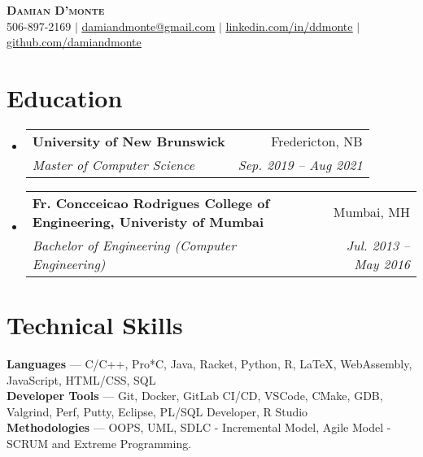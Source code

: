 \documentclass[letterpaper,10pt]{article}
\makeatletter
\newcommand{\resumeSubheading}[4]{
  \vspace{-2pt}\item
    \begin{tabular*}{0.97\textwidth}[t]{l@{\extracolsep{\fill}}r}
      \textbf{#1} & #2 \\
      \textit{\small#3} & \textit{\small #4} \\
    \end{tabular*}\vspace{-7pt}
}
\newcommand{\resumeSubHeadingListStart}{\begin{itemize}[leftmargin=0.15in, label={}]}
\newcommand{\resumeSubHeadingListEnd}{\end{itemize}}
\makeatother
\begin{document}

\begin{center}
    \textbf{\Huge \scshape Damian D'monte} \\ \vspace{4pt}
    \small 506-897-2169 $|$ \href{mailto:x@x.com}{\underline{damiandmonte@gmail.com}} $|$ 
    \href{https://linkedin.com/in/ddmonte}{\underline{linkedin.com/in/ddmonte}} $|$
    \href{https://github.com/damiandmonte}{\underline{github.com/damiandmonte}}
\end{center}


\section{Education}
  \resumeSubHeadingListStart
    \resumeSubheading
      {University of New Brunswick}{Fredericton, NB}
      {Master of Computer Science}{Sep. 2019 -- Aug 2021}
    \resumeSubheading
      {Fr. Concceicao Rodrigues College of Engineering, Univeristy of Mumbai}{Mumbai, MH}
      {Bachelor of Engineering (Computer Engineering) }{Jul. 2013 -- May 2016}
  \resumeSubHeadingListEnd


%
\section{Technical Skills}
 \begin{itemize}[leftmargin=0.15in, label={}]
    \small{\item{
     \textbf{Languages}{ --- C/C++, Pro*C, Java, Racket, Python, R, \LaTeX{}, WebAssembly, JavaScript, HTML/CSS, SQL} \\
     \textbf{Developer Tools}{ --- Git, Docker, GitLab CI/CD, VSCode, CMake, GDB, Valgrind, Perf, Putty, Eclipse, PL/SQL Developer, R Studio} \\
     \textbf{Methodologies}{ --- OOPS, UML, SDLC - Incremental Model, Agile Model - SCRUM and Extreme Programming.}
    }}
 \end{itemize}
\end{document}
